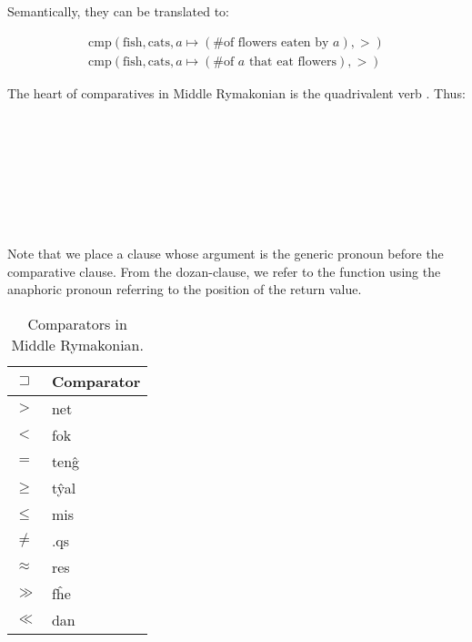 \documentclass{book}
\newcommand{\lname}{Middle Rymakonian}
\begin{document}
Semantically, they can be translated to:

\begin{gather}
    \text{cmp}(\text{fish}, \text{cats}, a \mapsto (\text{\# of flowers eaten by } a), >) \\
    \text{cmp}(\text{fish}, \text{cats}, a \mapsto (\text{\# of } a \text{ that eat flowers}), >)
\end{gather}

The heart of comparatives in \lname{} is the quadrivalent verb . Thus: \\
~\\
 \\
      \hlvii{$>$} \\
      \\
~\\
 \\
       \hlviii{$>$} \\
      \\

Note that we place a clause whose argument is the generic pronoun before the comparative clause. From the dozan-clause, we refer to the function using the anaphoric pronoun referring to the position of the return value.

\begin{table}[h]
    \caption{Comparators in \lname.}
    \centering
    \begin{tabular}{|l|>{\kardinal}l|}
        \hline
        $\sqsupset$ & \textnormal{Comparator} \\
        \hline
        $>$ & net \\
        $<$ & fok \\
        $=$ & ten\^g \\
        $\ge$ & t\^yal \\
        $\le$ & mis \\
        $\ne$ & .qs \\
        $\approx$ & res \\
        $\gg$ & f\^he \\
        $\ll$ & dan \\
        \hline
    \end{tabular}
\end{table}
\end{document}
